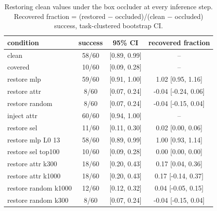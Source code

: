 \begin{table}[t]
\centering\small
\caption{Restoring clean values under the box occluder at every inference step. Recovered fraction = (restored $-$ occluded)/(clean $-$ occluded) success, task-clustered bootstrap CI.}
\label{tab_E2_controls}
\begin{tabular}{l c c c}
\toprule
condition & success & 95\% CI & recovered fraction \\
\midrule
clean & 58/60 &  [0.89, 0.99] & -- \\
covered & 10/60 &  [0.09, 0.28] & -- \\
restore mlp & 59/60 &  [0.91, 1.00] & 1.02 [0.95, 1.16] \\
restore attr & 8/60 &  [0.07, 0.24] & -0.04 [-0.24, 0.06] \\
restore random & 8/60 &  [0.07, 0.24] & -0.04 [-0.15, 0.04] \\
inject attr & 60/60 &  [0.94, 1.00] & -- \\
restore sel & 11/60 &  [0.11, 0.30] & 0.02 [0.00, 0.06] \\
restore mlp L0 13 & 58/60 &  [0.89, 0.99] & 1.00 [0.93, 1.14] \\
restore sel top100 & 10/60 &  [0.09, 0.28] & 0.00 [0.00, 0.00] \\
restore attr k300 & 18/60 &  [0.20, 0.43] & 0.17 [0.04, 0.36] \\
restore attr k1000 & 18/60 &  [0.20, 0.43] & 0.17 [-0.14, 0.37] \\
restore random k1000 & 12/60 &  [0.12, 0.32] & 0.04 [-0.05, 0.15] \\
restore random k300 & 8/60 &  [0.07, 0.24] & -0.04 [-0.15, 0.04] \\
\bottomrule
\end{tabular}
\end{table}
